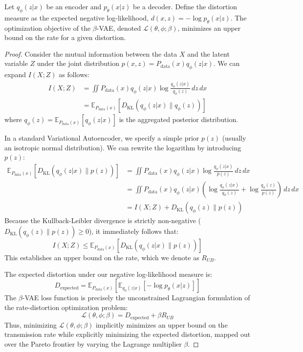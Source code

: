 \begin{theorem}
Let $q_\phi(z|x)$ be an encoder and $p_\theta(x|z)$ be a decoder. Define the distortion measure as the expected negative log-likelihood, $d(x, z) = -\log p_\theta(x|z)$. The optimization objective of the $\beta$-VAE, denoted $\mathcal{L}(\theta, \phi; \beta)$, minimizes an upper bound on the rate for a given distortion.
\end{theorem}
\begin{proof}
Consider the mutual information between the data $X$ and the latent variable $Z$ under the joint distribution $p(x, z) = P_{\text{data}}(x)q_\phi(z|x)$. We can expand $I(X;Z)$ as follows:
\begin{align}
    I(X;Z) &= \iint P_{\text{data}}(x) q_\phi(z|x) \log \frac{q_\phi(z|x)}{q_\phi(z)} \, dz \, dx \nonumber \\
    &= \mathbb{E}_{P_{\text{data}}(x)}\left[ D_{\text{KL}}(q_\phi(z|x) \parallel q_\phi(z)) \right]
\end{align}
where $q_\phi(z) = \mathbb{E}_{P_{\text{data}}(x)}[q_\phi(z|x)]$ is the aggregated posterior distribution. 

In a standard Variational Autoencoder, we specify a simple prior $p(z)$ (usually an isotropic normal distribution). We can rewrite the logarithm by introducing $p(z)$:
\begin{align}
    \mathbb{E}_{P_{\text{data}}(x)}\left[ D_{\text{KL}}(q_\phi(z|x) \parallel p(z)) \right] &= \iint P_{\text{data}}(x) q_\phi(z|x) \log \frac{q_\phi(z|x)}{p(z)} \, dz \, dx \nonumber \\
    &= \iint P_{\text{data}}(x) q_\phi(z|x) \left( \log \frac{q_\phi(z|x)}{q_\phi(z)} + \log \frac{q_\phi(z)}{p(z)} \right) \, dz \, dx \nonumber \\
    &= I(X;Z) + D_{\text{KL}}(q_\phi(z) \parallel p(z))
\end{align}
Because the Kullback-Leibler divergence is strictly non-negative ($D_{\text{KL}}(q_\phi(z) \parallel p(z)) \ge 0$), it immediately follows that:
\begin{equation}
    I(X;Z) \le \mathbb{E}_{P_{\text{data}}(x)}\left[ D_{\text{KL}}(q_\phi(z|x) \parallel p(z)) \right]
\end{equation}
This establishes an upper bound on the rate, which we denote as $R_{UB}$. 

The expected distortion under our negative log-likelihood measure is:
\begin{equation}
    D_{\text{expected}} = \mathbb{E}_{P_{\text{data}}(x)}\left[ \mathbb{E}_{q_\phi(z|x)}[-\log p_\theta(x|z)] \right]
\end{equation}
The $\beta$-VAE loss function is precisely the unconstrained Lagrangian formulation of the rate-distortion optimization problem:
\begin{equation}
    \mathcal{L}(\theta, \phi; \beta) = D_{\text{expected}} + \beta R_{UB}
\end{equation}
Thus, minimizing $\mathcal{L}(\theta, \phi; \beta)$ implicitly minimizes an upper bound on the transmission rate while explicitly minimizing the expected distortion, mapped out over the Pareto frontier by varying the Lagrange multiplier $\beta$.
\end{proof}

